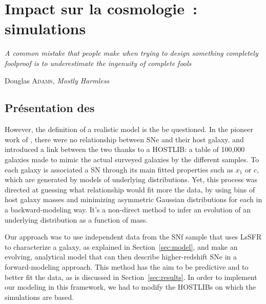 \documentclass[../main/main.tex]{subfiles}
\begin{document}
\dominitoc
\faketableofcontents
\dominilof
\fakelistoffigures
\dominilot
\fakelistoftables

\chapter{Impact sur la cosmologie~: simulations}\label{ch:sims}
\epigraph{\openquote\textit{A common mistake that people make when trying to
design something completely foolproof is to underestimate the ingenuity of
complete fools}\closequote}{Douglas \textsc{Adams}, \textit{Mostly Harmless}}

\vfill
\minitoc
\vfill

\newpage

\section{Présentation des \hostlib}\label{sec:hpres}

However, the definition of a realistic model is the be questioned. In the
pioneer work of \cite{scolnic2016}, there were no relationship between SNe and
their host galaxy. \cite{popovic2021a} and~\cite{smith2020} introduced a link
between the two thanks to a HOSTLIB: a table of 100,000 galaxies made to mimic
the actual surveyed galaxies by the different samples. To each galaxy is
associated a SN through its main fitted properties such as $x_1$ or $c$, which
are generated by models of underlying distributions. Yet, this process was
directed at guessing what relationship would fit more the data, by using bins of
host galaxy masses and minimizing asymmetric Gaussian distributions for each in
a backward-modeling way. It's a non-direct method to infer an evolution of an
underlying distribution as a function of mass.

Our approach was to use independent data from the SNf sample that uses LsSFR to
characterize a galaxy, as explained in Section~\ref{sec:model}, and make an
evolving, analytical model that can then describe higher-redshift SNe in a
forward-modeling approach. This method has the aim to be predictive and to
better fit the data, as is discussed in Section~\ref{sec:results}. In order to
implement our modeling in this framework, we had to modify the HOSTLIBs on which
the simulations are based.

\end{document}
